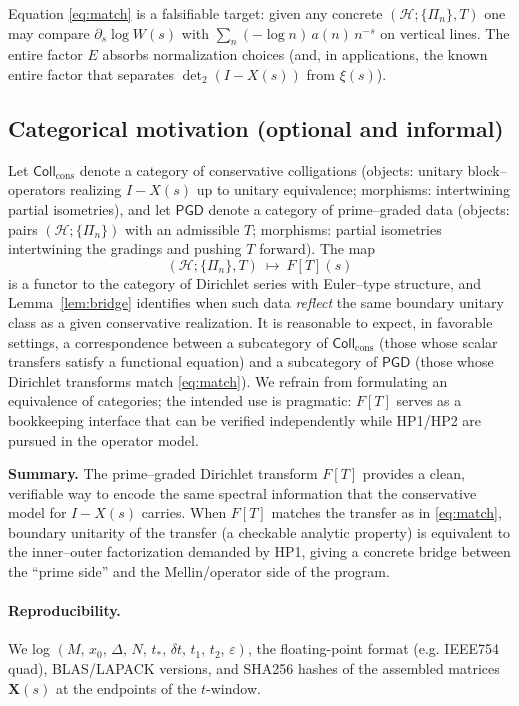 \begin{remark}
Equation \eqref{eq:match} is a falsifiable target: given any concrete $(\mathcal H;\{\Pi_n\},T)$ one may compare $\partial_s\log W(s)$ with $\sum_n (-\log n)\,a(n)\,n^{-s}$ on vertical lines. The entire factor $E$ absorbs normalization choices (and, in applications, the known entire factor that separates $\det_2(I-X(s))$ from $\xi(s)$).
\end{remark}

\subsection{Categorical motivation (optional and informal)}
Let $\mathsf{Coll}_{\mathrm{cons}}$ denote a category of conservative colligations (objects: unitary block–operators realizing $I-X(s)$ up to unitary equivalence; morphisms: intertwining partial isometries), and let $\mathsf{PGD}$ denote a category of prime–graded data (objects: pairs $(\mathcal H;\{\Pi_n\})$ with an admissible $T$; morphisms: partial isometries intertwining the gradings and pushing $T$ forward). The map
\[
(\mathcal H;\{\Pi_n\},T)\ \longmapsto\ F[T](s)
\]
is a functor to the category of Dirichlet series with Euler–type structure, and Lemma~\ref{lem:bridge} identifies when such data \emph{reflect} the same boundary unitary class as a given conservative realization. It is reasonable to expect, in favorable settings, a correspondence between a subcategory of $\mathsf{Coll}_{\mathrm{cons}}$ (those whose scalar transfers satisfy a functional equation) and a subcategory of $\mathsf{PGD}$ (those whose Dirichlet transforms match \eqref{eq:match}). We refrain from formulating an equivalence of categories; the intended use is pragmatic: $F[T]$ serves as a bookkeeping interface that can be verified independently while HP1/HP2 are pursued in the operator model.

\medskip
\noindent\textbf{Summary.} The prime–graded Dirichlet transform $F[T]$ provides a clean, verifiable way to encode the same spectral information that the conservative model for $I-X(s)$ carries. When $F[T]$ matches the transfer as in \eqref{eq:match}, boundary unitarity of the transfer (a checkable analytic property) is equivalent to the inner–outer factorization demanded by HP1, giving a concrete bridge between the “prime side” and the Mellin/operator side of the program.

\paragraph{Reproducibility.}
We log $(M,\,x_0,\,\Delta,\,N,\,t_\ast,\,\delta t,\,t_1,\,t_2,\,\varepsilon)$, the floating-point format (e.g. IEEE754 quad), BLAS/LAPACK versions, and SHA256 hashes of the assembled matrices $\mathbf X(s)$ at the endpoints of the $t$-window.


